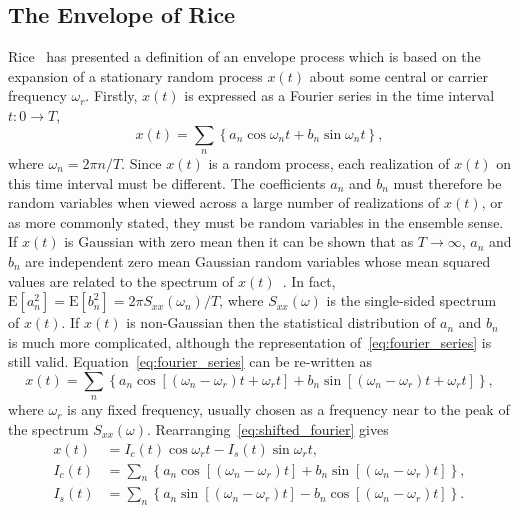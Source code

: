 \documentclass[12pt]{article}
\theoremstyle{plain}
\theoremstyle{definition}
\theoremstyle{remark}
\begin{document}
\subsection{The Envelope of Rice}
Rice~\cite{rice1954} has presented a definition of an envelope process which is based on the expansion of a stationary random process $x(t)$ about some central or carrier frequency $\omega_r$. Firstly, $x(t)$ is expressed as a Fourier series in the time interval $t: 0 \to T$,
\begin{equation}
    x(t) = \sum_n \left\{ a_n \cos \omega_n t + b_n \sin \omega_n t \right\},
    \label{eq:fourier_series}
\end{equation}
where $\omega_n = 2\pi n / T$. Since $x(t)$ is a random process, each realization of $x(t)$ on this time interval must be different. The coefficients $a_n$ and $b_n$ must therefore be random variables when viewed across a large number of realizations of $x(t)$, or as more commonly stated, they must be random variables in the ensemble sense. If $x(t)$ is Gaussian with zero mean then it can be shown that as $T \to \infty$, $a_n$ and $b_n$ are independent zero mean Gaussian random variables whose mean squared values are related to the spectrum of $x(t)$~\cite{rice1954}. In fact, $\mathrm{E}[a_n^2] = \mathrm{E}[b_n^2] = 2\pi S_{xx}(\omega_n) / T$, where $S_{xx}(\omega)$ is the single-sided spectrum of $x(t)$. If $x(t)$ is non-Gaussian then the statistical distribution of $a_n$ and $b_n$ is much more complicated, although the representation of~\eqref{eq:fourier_series} is still valid. Equation~\eqref{eq:fourier_series} can be re-written as
\begin{equation}
    x(t) = \sum_n \left\{ a_n \cos \left[ (\omega_n - \omega_r)t + \omega_r t \right] + b_n \sin \left[ (\omega_n - \omega_r)t + \omega_r t \right] \right\},
    \label{eq:shifted_fourier}
\end{equation}
where $\omega_r$ is any fixed frequency, usually chosen as a frequency near to the peak of the spectrum $S_{xx}(\omega)$. Rearranging~\eqref{eq:shifted_fourier} gives
\begin{align}
    x(t) &= I_c(t) \cos \omega_r t - I_s(t) \sin \omega_r t, \label{eq:rice_ic_is_a} \\
    I_c(t) &= \sum_n \left\{ a_n \cos [(\omega_n - \omega_r)t] + b_n \sin [(\omega_n - \omega_r)t] \right\}, \label{eq:rice_ic_b} \\
    I_s(t) &= \sum_n \left\{ a_n \sin [(\omega_n - \omega_r)t] - b_n \cos [(\omega_n - \omega_r)t] \right\}. \label{eq:rice_is_c}
\end{align}
\end{document}
